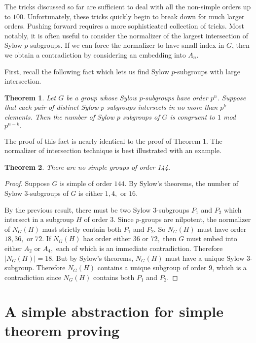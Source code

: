 \documentclass[11pt, oneside]{article}   	%
\newtheorem{theorem}{Theorem}
\begin{document}
The tricks discussed so far are sufficient to deal with all the non-simple orders up to $100.$  %
Unfortunately, these tricks quickly begin to break down for much larger orders.  Pushing forward requires a more sophisticated collection of tricks.  Most notably, it is often useful to consider the normalizer of the largest intersection of Sylow $p$-subgroups.  If we can force the normalizer to have small index in $G$, then we obtain a contradiction by considering an embedding into $A_n.$

First, recall the following fact which lets us find Sylow $p$-subgroups with large intersection.
\begin{theorem}
Let $G$ be a group whose Sylow $p$-subgroups have order $p^n$. Suppose that each pair of distinct Sylow $p$-subgroups intersects in no more than $p^k$ elements.  Then the number of Sylow $p$ subgroups of $G$ is congruent to $1$ mod $p^{n-k}.$
\end{theorem}

The proof of this fact is nearly identical to the proof of Theorem 1.  The normalizer of intersection technique is best illustrated with an example.

\begin{theorem}
There are no simple groups of order 144.
\end{theorem}
\begin{proof}
Suppose $G$ is simple of order $144$. By Sylow's theorems, the number of Sylow $3$-subgroups of $G$ is either $1,4,$ or $16$.  

By the previous result, there must be two Sylow $3$-subgroups $P_1$ and $P_2$ which intersect in a subgroup $H$ of order $3.$  Since $p$-groups are nilpotent, the normalizer of $N_G(H)$ must strictly contain both $P_1$ and $P_2$.  So $N_G(H)$ must have order $18, 36, $ or $72$.  If $N_G(H)$ has order either $36$ or $72,$ then $G$ must embed into either $A_2$ or $A_4,$ each of which is an immediate contradiction.  Therefore $|N_G(H)| = 18.$  But by Sylow's theorems, $N_G(H)$ must have a unique Sylow $3$-subgroup.  Therefore $N_G(H)$ contains a unique subgroup of order $9$, which is a contradiction since $N_G(H)$ contains both $P_1$ and $P_2$.
\end{proof}


\section{A simple abstraction for simple theorem proving}
\end{document}

